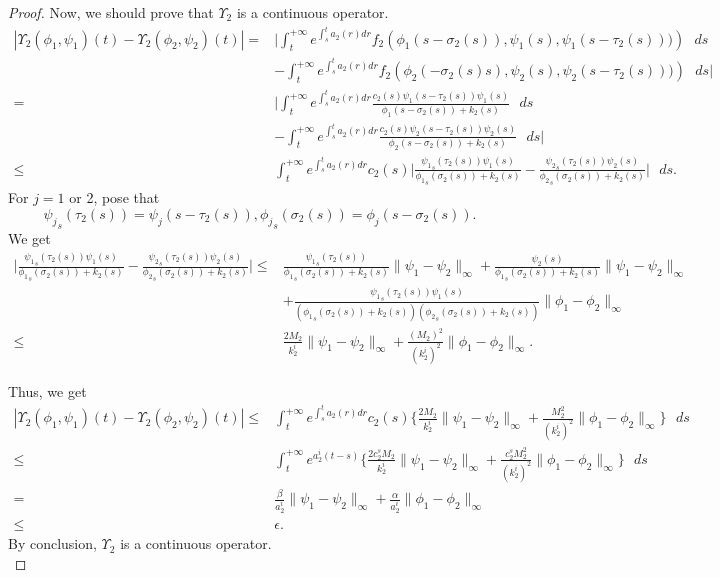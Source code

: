 \documentclass[[a4paper,10pt]{article}
\begin{document}
\begin{proof}
  Now, we should prove that $\Upsilon_2$ is a continuous operator.
 {\small \begin{align*}
 |\Upsilon_2(\phi_1,\psi_1)(t)-\Upsilon_2(\phi_2,\psi_2)(t)|=& \displaystyle{\bigg|\int_t^{+\infty} e^{\int^t_s a_2(r)dr}f_2\left(\phi_1(s-\sigma_2(s)),\psi_1(s),\psi_1(s-\tau_2(s)))\right)\text{ } ds}\\
  &\displaystyle{-\int_t^{+\infty} e^{\int^t_s a_2(r)dr}f_2\left(\phi_2(-\sigma_2(s)s),\psi_2(s),\psi_2(s-\tau_2(s)))\right)\text{ } ds\bigg|}\\
=&\displaystyle{\bigg|\int_t^{+\infty} e^{\int^t_s a_2(r)dr}}\frac{c_2(s)\psi_1(s-\tau_2(s))\psi_1(s)}{\phi_1(s-\sigma_2(s))+k_2(s)}\text{ } ds\\
&\displaystyle{-\int_t^{+\infty} e^{\int^t_s a_2(r)dr}}\frac{c_2(s)\psi_2(s-\tau_2(s))\psi_2(s)}{\phi_2(s-\sigma_2(s))+k_2(s)}\text{ } ds\bigg|\\
\leq&{\displaystyle{\int_t^{+\infty} e^{\int^t_s a_2(r)dr}}}c_2(s)\bigg|\frac{{\psi_1}_s(\tau_2(s))\psi_1(s)}{{\phi_1}_s(\sigma_2(s))+k_2(s)}-
\frac{{\psi_2}_s(\tau_2(s))\psi_2(s)}{{\phi_2}_s(\sigma_2(s))+k_2(s)}\bigg|\text{ } ds.
  \end{align*}}
For $j=1$ or 2, pose that
 $${\psi_j}_s(\tau_2(s))=\psi_j(s-\tau_2(s)),{\phi_j}_s(\sigma_2(s))=\phi_j(s-\sigma_2(s)). $$ 
 We get
 {\small\begin{align*}
\bigg|\frac{{\psi_1}_s(\tau_2(s))\psi_1(s)}{{\phi_1}_s(\sigma_2(s))+k_2(s)}-
\frac{{\psi_2}_s(\tau_2(s))\psi_2(s)}{{\phi_2}_s(\sigma_2(s))+k_2(s)}\bigg|\leq&\frac{{\psi_1}_s(\tau_2(s))}{{\phi_1}_s(\sigma_2(s))+k_2(s)}\|\psi_1-\psi_2\|_{\infty}+\frac{\psi_2(s)}{{\phi_1}_s(\sigma_2(s))+k_2(s)}\|\psi_1-\psi_2\|_{\infty}\\
&+\frac{{\psi_1}_s(\tau_2(s))\psi_1(s)}{({\phi_1}_s(\sigma_2(s))+k_2(s))({\phi_2}_s(\sigma_2(s))+k_2(s))}\|\phi_1-\phi_2\|_{\infty}\\
\leq& \frac{2M_2}{k_2^i}\|\psi_1-\psi_2\|_{\infty}+\frac{(M_2)^2}{(k_2^i)^2}\|\phi_1-\phi_2\|_{\infty}.
\end{align*}}

Thus, we get 
{\small\begin{align*}
  |\Upsilon_2(\phi_1,\psi_1)(t)-\Upsilon_2(\phi_2,\psi_2)(t)| \leq&{\displaystyle{\int_t^{+\infty} e^{\int^t_s a_2(r)dr}c_2(s)}}\big\{ \frac{2M_2}{k_2^i}\|\psi_1-\psi_2\|_{\infty}+\frac{M_2^2}{(k_2^i)^2}\|\phi_1-\phi_2\|_{\infty}\big\}\text{ }ds\\
  \leq&{\displaystyle{\int_t^{+\infty} e^{a_2^i (t-s)}}}\big\{ \frac{2c_2^sM_2}{k_2^i}\|\psi_1-\psi_2\|_{\infty}+\frac{c_2^sM_2^2}{(k_2^i)^2}\|\phi_1-\phi_2\|_{\infty}\big\}\text{ }ds\\
  =&\frac{\beta}{a_2^i}\|\psi_1-\psi_2\|_{\infty}+\frac{\alpha}{a_2^i}\|\phi_1-\phi_2\|_{\infty} \\
  \leq& \epsilon.
  \end{align*}}
   By conclusion, $\Upsilon_2$ is a continuous operator.
  \\
  

\end{proof}
\end{document}
